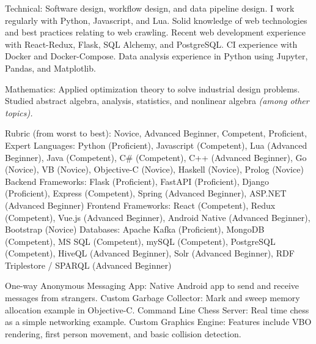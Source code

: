 \documentclass[10pt,a4paper]{article} %
\begin{document}

\inlineheadsection %
{Technical:}
{Software design, workflow design, and data pipeline design. I work regularly with Python, Javascript, and Lua. Solid knowledge of web technologies and best practices relating to web crawling. Recent web development experience with React-Redux, Flask, SQL Alchemy, and PostgreSQL. CI experience with Docker and Docker-Compose. Data analysis experience in Python using Jupyter, Pandas, and Matplotlib.}


\inlineheadsection %
{Mathematics:}
{Applied optimization theory to solve industrial design problems. Studied abstract algebra, analysis, statistics, and nonlinear algebra \textit{(among other topics).}}


Rubric (from worst to best): Novice, Advanced Beginner, Competent, Proficient, Expert
\inlineheadsection %
{Languages:}
{Python (Proficient), Javascript (Competent), Lua (Advanced Beginner), Java (Competent), C# (Competent), C++ (Advanced Beginner), Go (Novice), VB (Novice), Objective-C (Novice), Haskell (Novice), Prolog (Novice)}
\inlineheadsection %
{Backend Frameworks:}
{Flask (Proficient), FastAPI (Proficient), Django (Proficient), Express (Competent), Spring (Advanced Beginner), ASP.NET (Advanced Beginner)}
\inlineheadsection %
{Frontend Frameworks:}
{React (Competent), Redux (Competent), Vue.js (Advanced Beginner), Android Native (Advanced Beginner), Bootstrap (Novice)}
\inlineheadsection %
{Databases:}
{Apache Kafka (Proficient), MongoDB (Competent), MS SQL (Competent), mySQL (Competent), PostgreSQL (Competent), HiveQL (Advanced Beginner), Solr (Advanced Beginner), RDF Triplestore / SPARQL (Advanced Beginner)}

\spacedhrule{1.6em}{-0.4em} %

\inlineheadsection
{One-way Anonymous Messaging App:}
{Native Android app to send and receive messages from strangers.}
\inlineheadsection
{Custom Garbage Collector:}
{Mark and sweep memory allocation example in Objective-C.}
\inlineheadsection
{Command Line Chess Server:}
{Real time chess as a simple networking example.}
\inlineheadsection
{Custom Graphics Engine:}
{ Features include VBO rendering, first person movement, and basic collision detection.}
\end{document}
